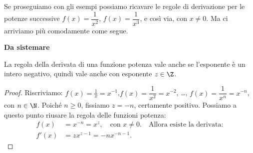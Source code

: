 
Se proseguiamo con gli esempi possiamo ricavare le regole di 
derivazione per le potenze successive \(f(x)=\dfrac{1}{x^2}\), 
\(f(x)=\dfrac{1}{x^3}\), e così via, con \(x\ne 0\). Ma ci arriviamo 
più comodamente come segue.


\begin{center}\textbf{Da sistemare}\end{center}

\begin{teorema}
La regola della derivata di una funzione potenza vale anche se 
l'esponente è un intero negativo, quindi vale anche con esponente 
\(z\in\Z\).
\end{teorema}

\begin{proof}
 Riscriviamo: \(f(x)=\frac{1}{x}=x^{-1}\),\quad  \(f(x)=\dfrac{1}{x^2}= 
x^{-2}\), \dots , \(f(x)=\dfrac{1}{x^n}=x^{-n}\), con \(n\in \N\). 
Poiché \(n\geqslant 0\), fissiamo \(z=-n\), certamente positivo.
Possiamo a questo punto riusare la regola delle funzioni potenza:
\begin{align*}
f(x)&=x^{-n}=x^z, \quad \text{con }x\ne 0.\quad  \text{Allora esiste la 
derivata:}\\
f'(x)&= zx^{z-1}=-nx^{-n-1}.
\end{align*}
\end{proof}

